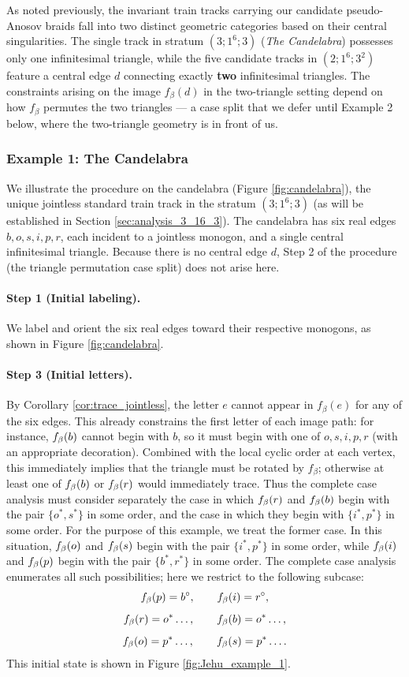 As noted previously, the invariant train tracks carrying our candidate pseudo-Anosov braids fall into two distinct geometric categories based on their central singularities. The single track in stratum $(3;1^6;3)$ (\textit{The Candelabra}) possesses only one infinitesimal triangle, while the five candidate tracks in $(2;1^6;3^2)$ feature a central edge $d$ connecting exactly \textbf{two} infinitesimal triangles. The constraints arising on the image $f_\beta(d)$ in the two-triangle setting depend on how $f_\beta$ permutes the two triangles --- a case split that we defer until Example 2 below, where the two-triangle geometry is in front of us.


\subsubsection*{Example 1: The Candelabra}
\label{subsec:example_candelabra}

We illustrate the procedure on the candelabra (Figure \ref{fig:candelabra}), the unique jointless standard train track in the stratum $(3;1^6;3)$ (as will be established in Section \ref{sec:analysis_3_16_3}). The candelabra has six real edges $b, o, s, i, p, r$, each incident to a jointless monogon, and a single central infinitesimal triangle. Because there is no central edge $d$, Step 2 of the procedure (the triangle permutation case split) does not arise here.

\paragraph{Step 1 (Initial labeling).} We label and orient the six real edges toward their respective monogons, as shown in Figure \ref{fig:candelabra}.

\paragraph{Step 3 (Initial letters).} By Corollary \ref{cor:trace_jointless}, the letter $e$ cannot appear in $f_\beta(e)$ for any of the six edges. This already constrains the first letter of each image path: for instance, $f_\beta(b)$ cannot begin with $b$, so it must begin with one of $o, s, i, p, r$ (with an appropriate decoration). Combined with the local cyclic order at each vertex, this immediately implies that the triangle must be rotated by $f_\beta$; otherwise at least one of $f_\beta(b)$ or $f_\beta(r)$ would immediately trace. Thus the complete case analysis must consider separately the case in which $f_\beta(r)$ and $f_\beta(b)$ begin with the pair $\{o^{*}, s^{*}\}$ in some order, and the case in which they begin with $\{i^{*}, p^{*}\}$ in some order. For the purpose of this example, we treat the former case. In this situation, $f_\beta(o)$ and $f_\beta(s)$ begin with the pair $\{i^{*}, p^{*}\}$ in some order, while $f_\beta(i)$ and $f_\beta(p)$ begin with the pair $\{b^{*}, r^{*}\}$ in some order. The complete case analysis enumerates all such possibilities; here we restrict to the following subcase:
\[
f_\beta(p) = b^\circ, \qquad f_\beta(i) = r^\circ,
\]
\[
f_\beta(r) = o^*\ldots, \qquad f_\beta(b) = o^*\ldots,
\]
\[
f_\beta(o) = p^*\ldots, \qquad f_\beta(s) = p^*\ldots.
\]
This initial state is shown in Figure \ref{fig:Jehu_example_1}.

